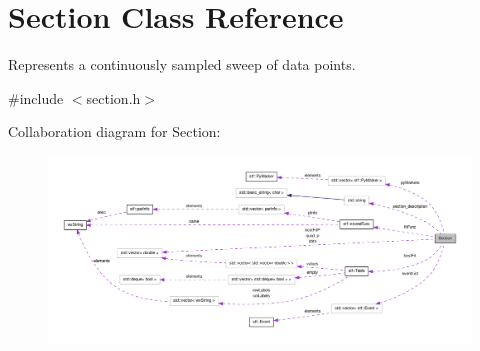 \hypertarget{classSection}{
\section{Section Class Reference}
\label{classSection}
}


Represents a continuously sampled sweep of data points.  




{\ttfamily \#include $<$section.h$>$}



Collaboration diagram for Section:
\nopagebreak
\begin{figure}[H]
\begin{center}
\leavevmode
\includegraphics[width=400pt]{classSection__coll__graph}
\end{center}
\end{figure}
